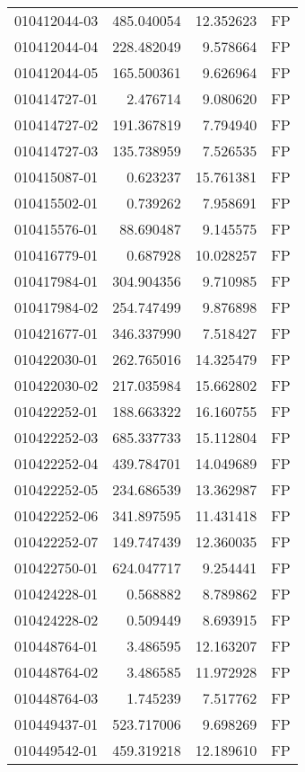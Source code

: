 \begin{tabular}{lrrl}
010412044-03 &  485.040054 &    12.352623 &   FP \\
010412044-04 &  228.482049 &     9.578664 &   FP \\
010412044-05 &  165.500361 &     9.626964 &   FP \\
010414727-01 &    2.476714 &     9.080620 &   FP \\
010414727-02 &  191.367819 &     7.794940 &   FP \\
010414727-03 &  135.738959 &     7.526535 &   FP \\
010415087-01 &    0.623237 &    15.761381 &   FP \\
010415502-01 &    0.739262 &     7.958691 &   FP \\
010415576-01 &   88.690487 &     9.145575 &   FP \\
010416779-01 &    0.687928 &    10.028257 &   FP \\
010417984-01 &  304.904356 &     9.710985 &   FP \\
010417984-02 &  254.747499 &     9.876898 &   FP \\
010421677-01 &  346.337990 &     7.518427 &   FP \\
010422030-01 &  262.765016 &    14.325479 &   FP \\
010422030-02 &  217.035984 &    15.662802 &   FP \\
010422252-01 &  188.663322 &    16.160755 &   FP \\
010422252-03 &  685.337733 &    15.112804 &   FP \\
010422252-04 &  439.784701 &    14.049689 &   FP \\
010422252-05 &  234.686539 &    13.362987 &   FP \\
010422252-06 &  341.897595 &    11.431418 &   FP \\
010422252-07 &  149.747439 &    12.360035 &   FP \\
010422750-01 &  624.047717 &     9.254441 &   FP \\
010424228-01 &    0.568882 &     8.789862 &   FP \\
010424228-02 &    0.509449 &     8.693915 &   FP \\
010448764-01 &    3.486595 &    12.163207 &   FP \\
010448764-02 &    3.486585 &    11.972928 &   FP \\
010448764-03 &    1.745239 &     7.517762 &   FP \\
010449437-01 &  523.717006 &     9.698269 &   FP \\
010449542-01 &  459.319218 &    12.189610 &   FP \\

\end{tabular}
